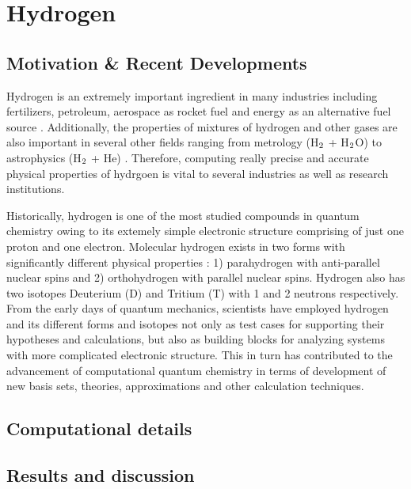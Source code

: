 \chapter{Hydrogen}
\section{Motivation \& Recent Developments}
    Hydrogen is an extremely important ingredient in many industries including fertilizers, petroleum, aerospace as rocket fuel and energy as an alternative fuel source \cite{Jacobsen2007}. Additionally, the properties of mixtures of hydrogen and other gases are also important in several other fields ranging from metrology (H$_{\rm 2}$ + H$_{\rm 2}$O) \cite{Hodges2004} to astrophysics (H$_{\rm 2}$ + He) \cite{Boothroyd2003}. Therefore, computing really precise and accurate physical properties of hydrgoen is vital to several industries as well as research institutions. 

    Historically, hydrogen is one of the most studied compounds in quantum chemistry owing to its extemely simple electronic structure comprising of just one proton and one electron. Molecular hydrogen exists in two forms with significantly different physical properties \cite{Jacobsen2007}: 1) parahydrogen with anti-parallel nuclear spins and 2) orthohydrogen with parallel nuclear spins. Hydrogen also has two isotopes Deuterium (D) and Tritium (T) with 1 and 2 neutrons respectively. From the early days of quantum mechanics, scientists have employed hydrogen and its different forms and isotopes not only as test cases for supporting their hypotheses and calculations, but also as building blocks for analyzing systems with more complicated electronic structure. This in turn has contributed to the advancement of computational quantum chemistry in terms of development of new basis sets, theories, approximations and other calculation techniques.
     
\section{Computational details}
\section{Results and discussion}
